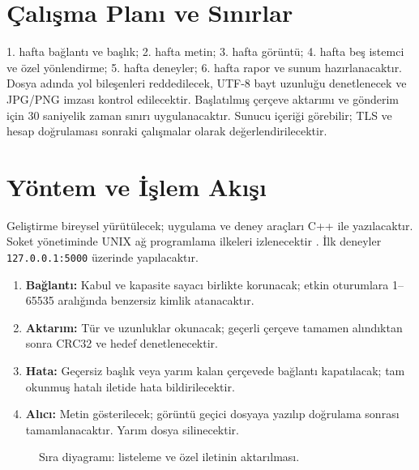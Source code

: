 \documentclass[12pt,oneside,a4paper]{article}
\begin{document}
\section{Çalışma Planı ve Sınırlar}
1. hafta bağlantı ve başlık; 2. hafta metin; 3. hafta görüntü;
4. hafta beş istemci ve özel yönlendirme; 5. hafta deneyler;
6. hafta rapor ve sunum hazırlanacaktır. Dosya adında yol bileşenleri
reddedilecek, UTF-8 bayt uzunluğu denetlenecek ve JPG/PNG imzası
kontrol edilecektir. Başlatılmış çerçeve aktarımı ve gönderim için
30 saniyelik zaman sınırı uygulanacaktır. Sunucu içeriği görebilir;
TLS ve hesap doğrulaması sonraki çalışmalar olarak değerlendirilecektir.

\clearpage
\section{Yöntem ve İşlem Akışı}
Geliştirme bireysel yürütülecek; uygulama ve deney araçları C++
ile yazılacaktır. Soket yönetiminde UNIX ağ programlama
ilkeleri izlenecektir \cite{stevens}. İlk deneyler
\texttt{127.0.0.1:5000} üzerinde yapılacaktır.

\begin{enumerate}
\setlength{\itemsep}{1pt}\setlength{\parsep}{0pt}
\item \textbf{Bağlantı:} Kabul ve kapasite sayacı birlikte korunacak;
  etkin oturumlara 1--65535 aralığında benzersiz kimlik atanacaktır.
\item \textbf{Aktarım:} Tür ve uzunluklar okunacak; geçerli çerçeve
  tamamen alındıktan sonra CRC32 ve hedef denetlenecektir.
\item \textbf{Hata:} Geçersiz başlık veya yarım kalan çerçevede
  bağlantı kapatılacak; tam okunmuş hatalı iletide hata bildirilecektir.
\item \textbf{Alıcı:} Metin gösterilecek; görüntü geçici dosyaya
  yazılıp doğrulama sonrası tamamlanacaktır. Yarım dosya silinecektir.
\end{enumerate}

\begin{figure}[H]
\centering
{}
\caption{Sıra diyagramı: listeleme ve özel iletinin aktarılması.}
\label{fig:sequence}
\end{figure}
\end{document}

